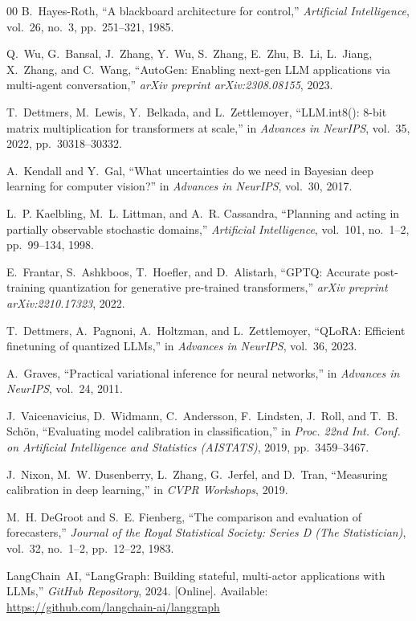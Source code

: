 \documentclass[conference]{IEEEtran}
\begin{document}
\begin{thebibliography}{00}
B.~Hayes-Roth,
``A blackboard architecture for control,''
\textit{Artificial Intelligence},
vol.~26, no.~3, pp.~251--321, 1985.

Q.~Wu, G.~Bansal, J.~Zhang, Y.~Wu, S.~Zhang, E.~Zhu, B.~Li,
L.~Jiang, X.~Zhang, and C.~Wang,
``AutoGen: Enabling next-gen LLM applications via multi-agent
conversation,''
\textit{arXiv preprint arXiv:2308.08155}, 2023.

T.~Dettmers, M.~Lewis, Y.~Belkada, and L.~Zettlemoyer,
``LLM.int8(): 8-bit matrix multiplication for transformers at scale,''
in \textit{Advances in NeurIPS}, vol.~35, 2022, pp.~30318--30332.

A.~Kendall and Y.~Gal,
``What uncertainties do we need in Bayesian deep learning for
computer vision?''
in \textit{Advances in NeurIPS}, vol.~30, 2017.

L.~P. Kaelbling, M.~L. Littman, and A.~R. Cassandra,
``Planning and acting in partially observable stochastic domains,''
\textit{Artificial Intelligence},
vol.~101, no.~1--2, pp.~99--134, 1998.

E.~Frantar, S.~Ashkboos, T.~Hoefler, and D.~Alistarh,
``GPTQ: Accurate post-training quantization for generative
pre-trained transformers,''
\textit{arXiv preprint arXiv:2210.17323}, 2022.

T.~Dettmers, A.~Pagnoni, A.~Holtzman, and L.~Zettlemoyer,
``QLoRA: Efficient finetuning of quantized LLMs,''
in \textit{Advances in NeurIPS}, vol.~36, 2023.

A.~Graves,
``Practical variational inference for neural networks,''
in \textit{Advances in NeurIPS}, vol.~24, 2011.

J.~Vaicenavicius, D.~Widmann, C.~Andersson, F.~Lindsten,
J.~Roll, and T.~B. Sch\"{o}n,
``Evaluating model calibration in classification,''
in \textit{Proc. 22nd Int. Conf. on Artificial Intelligence and
Statistics (AISTATS)}, 2019, pp.~3459--3467.

J.~Nixon, M.~W. Dusenberry, L.~Zhang, G.~Jerfel, and D.~Tran,
``Measuring calibration in deep learning,''
in \textit{CVPR Workshops}, 2019.

M.~H. DeGroot and S.~E. Fienberg,
``The comparison and evaluation of forecasters,''
\textit{Journal of the Royal Statistical Society: Series D
(The Statistician)}, vol.~32, no.~1--2, pp.~12--22, 1983.

LangChain~AI,
``LangGraph: Building stateful, multi-actor applications with LLMs,''
\textit{GitHub Repository}, 2024.
[Online]. Available: \url{https://github.com/langchain-ai/langgraph}

\end{thebibliography}
\end{document}
